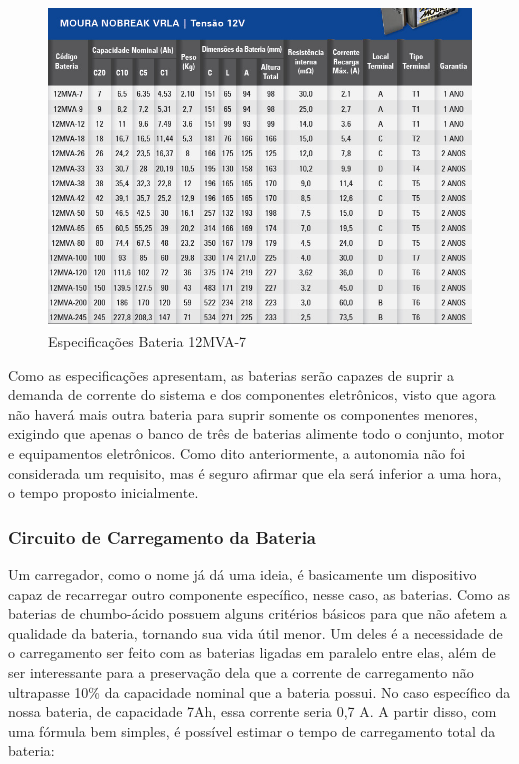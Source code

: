 	\begin{figure}[!htb]
		\centering
		\includegraphics[scale=0.5]{especificacao_bateria.jpeg}
		\caption{Especificações Bateria 12MVA-7}
		\label{img:especificacaobateria}
	\end{figure}
	
Como as especificações apresentam, as baterias serão capazes de suprir a demanda de corrente do sistema e dos componentes eletrônicos, visto que agora não haverá mais outra bateria para suprir somente os componentes menores, exigindo que apenas o banco de três de baterias alimente todo o conjunto, motor e equipamentos eletrônicos. Como dito anteriormente, a autonomia não foi considerada um requisito, mas é seguro afirmar que ela será inferior a uma hora, o tempo proposto inicialmente.

\subsubsection{Circuito de Carregamento da Bateria}
Um carregador, como o nome já dá uma ideia, é basicamente um dispositivo capaz de recarregar outro componente específico, nesse caso, as baterias. Como as baterias de chumbo-ácido possuem alguns critérios básicos para que não afetem a qualidade da bateria, tornando sua vida útil menor. Um deles é a necessidade de o carregamento ser feito com as baterias ligadas em paralelo entre elas, além de ser interessante para a preservação dela que a corrente de carregamento não ultrapasse 10\% da capacidade nominal que a bateria possui. No caso específico da nossa bateria, de capacidade 7Ah, essa corrente seria 0,7 A. 
A partir disso, com uma fórmula bem simples, é possível estimar o tempo de carregamento total da bateria:

